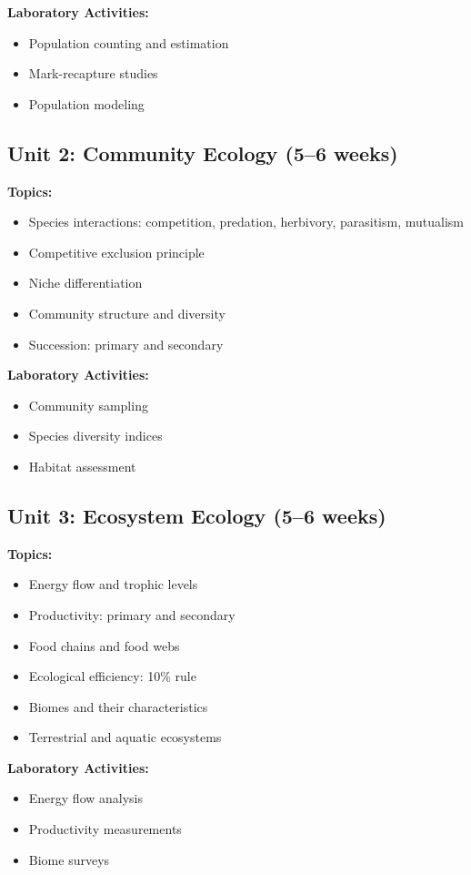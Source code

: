 \documentclass[12pt,oneside]{book}
\begin{document}
\textbf{Laboratory Activities:}
\begin{itemize}
    \item Population counting and estimation
    \item Mark-recapture studies
    \item Population modeling
\end{itemize}

\subsection{Unit 2: Community Ecology (5--6 weeks)}

\textbf{Topics:}
\begin{itemize}
    \item Species interactions: competition, predation, herbivory, parasitism, mutualism
    \item Competitive exclusion principle
    \item Niche differentiation
    \item Community structure and diversity
    \item Succession: primary and secondary
\end{itemize}

\textbf{Laboratory Activities:}
\begin{itemize}
    \item Community sampling
    \item Species diversity indices
    \item Habitat assessment
\end{itemize}

\subsection{Unit 3: Ecosystem Ecology (5--6 weeks)}

\textbf{Topics:}
\begin{itemize}
    \item Energy flow and trophic levels
    \item Productivity: primary and secondary
    \item Food chains and food webs
    \item Ecological efficiency: 10\% rule
    \item Biomes and their characteristics
    \item Terrestrial and aquatic ecosystems
\end{itemize}

\textbf{Laboratory Activities:}
\begin{itemize}
    \item Energy flow analysis
    \item Productivity measurements
    \item Biome surveys
\end{itemize}
\end{document}
